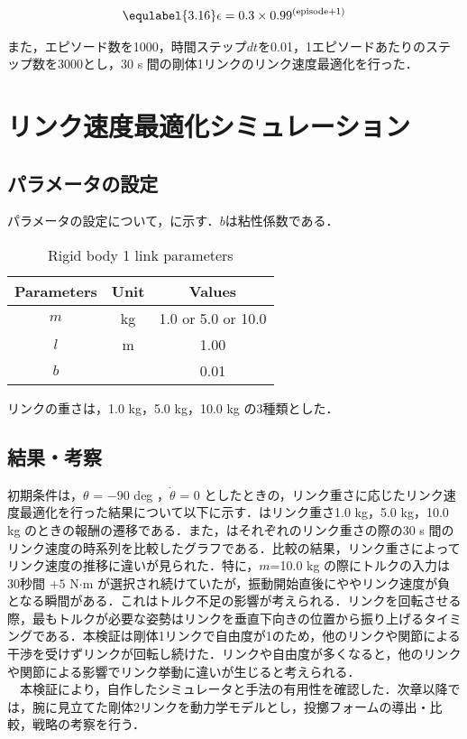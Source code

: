 \begin{eqnarray}
  \equlabel{3.16}
  \epsilon = 0.3 \times 0.99^{(\mathrm{episode} + 1)}
\end{eqnarray}

また，エピソード数を1000，時間ステップ$dt$を0.01，1エピソードあたりのステップ数を3000とし，30 s 間の剛体1リンクのリンク速度最適化を行った．
\section{リンク速度最適化シミュレーション}
\subsection{パラメータの設定}
パラメータの設定について，に示す．$b$は粘性係数である．
\begin{table}[tb]
  \begin{center}
    \caption{Rigid body 1 link parameters}
    \begin{tabular}{c|c|c}
      \hline
      Parameters & Unit & Values \\
      \hline
      $m$ & kg & 1.0 or 5.0 or 10.0\\
      $l$ & m & 1.00 \\
      $b$ &  & 0.01 \\
      \hline
    \end{tabular}
  \end{center}
\end{table}
リンクの重さは，1.0 kg，5.0 kg，10.0 kg の3種類とした．
\subsection{結果・考察}
初期条件は，$\theta$ = $-90$ deg ，$\dot{\theta}$ = 0 としたときの，リンク重さに応じたリンク速度最適化を行った結果について以下に示す．はリンク重さ1.0 kg，5.0 kg，10.0 kg のときの報酬の遷移である．また，はそれぞれのリンク重さの際の30 s 間のリンク速度の時系列を比較したグラフである．比較の結果，リンク重さによってリンク速度の推移に違いが見られた．特に，$m$=10.0 kg の際にトルクの入力は30秒間 $+ 5$ N$\cdot$m が選択され続けていたが，振動開始直後にややリンク速度が負となる瞬間がある．これはトルク不足の影響が考えられる．リンクを回転させる際，最もトルクが必要な姿勢はリンクを垂直下向きの位置から振り上げるタイミングである．本検証は剛体1リンクで自由度が1のため，他のリンクや関節による干渉を受けずリンクが回転し続けた．リンクや自由度が多くなると，他のリンクや関節による影響でリンク挙動に違いが生じると考えられる．\\
　本検証により，自作したシミュレータと手法の有用性を確認した．次章以降では，腕に見立てた剛体2リンクを動力学モデルとし，投擲フォームの導出・比較，戦略の考察を行う．

